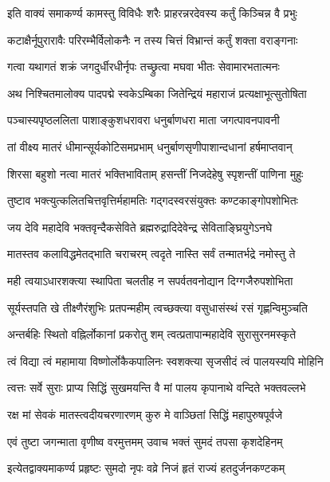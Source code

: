 \twolineshloka
{इति वाक्यं समाकर्ण्य कामस्तु विविधैः शरैः}
{प्राहरन्नरदेवस्य कर्तुं किञ्चिन्न वै प्रभुः}%

\twolineshloka
{कटाक्षैर्नूपुरारावैः परिरम्भैर्विलोकनैः}
{न तस्य चित्तं विभ्रान्तं कर्तुं शक्ता वराङ्गनाः}%

\twolineshloka
{गत्वा यथागतं शक्रं जगदुर्धीरधीर्नृपः}
{तच्छ्रुत्वा मघवा भीतः सेवामारभतात्मनः}%

\twolineshloka
{अथ निश्चितमालोक्य पादपद्मे स्वकेऽम्बिका}
{जितेन्द्रियं महाराजं प्रत्यक्षाभूत्सुतोषिता}%

\twolineshloka
{पञ्चास्यपृष्ठललिता पाशाङ्कुशधरावरा}
{धनुर्बाणधरा माता जगत्पावनपावनी}%

\twolineshloka
{तां वीक्ष्य मातरं धीमान्सूर्यकोटिसमप्रभाम्}
{धनुर्बाणसृणीपाशान्दधानां हर्षमाप्तवान्}%

\twolineshloka
{शिरसा बहुशो नत्वा मातरं भक्तिभाविताम्}
{हसन्तीं निजदेहेषु स्पृशन्तीं पाणिना मुहुः}%

\twolineshloka
{तुष्टाव भक्त्युत्कलितचित्तवृत्तिर्महामतिः}
{गद्गदस्वरसंयुक्तः कण्टकाङ्गोपशोभितः}%

\twolineshloka
{जय देवि महादेवि भक्तवृन्दैकसेविते}
{ब्रह्मरुद्रादिदेवेन्द्र सेविताङ्घ्रियुगेऽनघे}%

\twolineshloka
{मातस्तव कलाविद्धमेतद्भाति चराचरम्}
{त्वदृते नास्ति सर्वं तन्मातर्भद्रे नमोस्तु ते}%

\twolineshloka
{मही त्वयाऽधारशक्त्या स्थापिता चलतीह न}
{सपर्वतवनोद्यान दिग्गजैरुपशोभिता}%

\twolineshloka
{सूर्यस्तपति खे तीक्ष्णैरंशुभिः प्रतपन्महीम्}
{त्वच्छक्त्या वसुधासंस्थं रसं गृह्णन्विमुञ्चति}%

\twolineshloka
{अन्तर्बहिः स्थितो वह्निर्लोकानां प्रकरोतु शम्}
{त्वत्प्रतापान्महादेवि सुरासुरनमस्कृते}%

\twolineshloka
{त्वं विद्या त्वं महामाया विष्णोर्लोकैकपालिनः}
{स्वशक्त्या सृजसीदं त्वं पालयस्यपि मोहिनि}%

\twolineshloka
{त्वत्तः सर्वे सुराः प्राप्य सिद्धिं सुखमयन्ति वै}
{मां पालय कृपानाथे वन्दिते भक्तवल्लभे}%

\twolineshloka
{रक्ष मां सेवकं मातस्त्वदीयचरणारणम्}
{कुरु मे वाञ्छितां सिद्धिं महापुरुषपूर्वजे}%


\twolineshloka
{एवं तुष्टा जगन्माता वृणीष्व वरमुत्तमम्}
{उवाच भक्तं सुमदं तपसा कृशदेहिनम्}%

\twolineshloka
{इत्येतद्वाक्यमाकर्ण्य प्रहृष्टः सुमदो नृपः}
{वव्रे निजं हृतं राज्यं हतदुर्जनकण्टकम्}%

